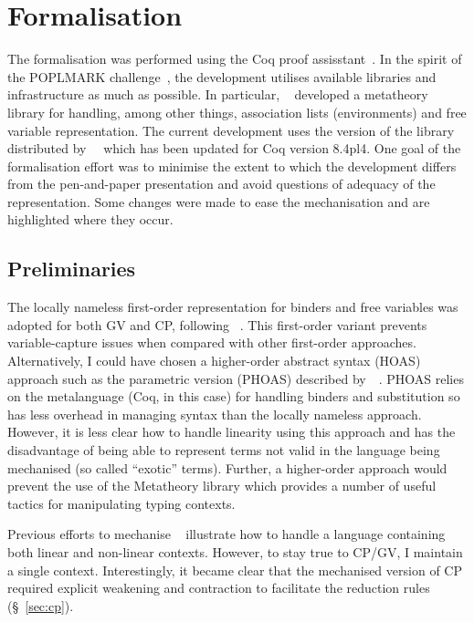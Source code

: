 \section{Formalisation}

The formalisation was performed using the Coq proof
assisstant~\cite{Coq:manual}. In the spirit of the POPLMARK
challenge~\cite{Aydemir:2005:MMM}, the development utilises available
libraries and infrastructure as much as possible. In particular,
\citeauthor{Aydemir:2008:EFM}~\cite{Aydemir:2008:EFM} developed a metatheory
library for handling, among other things, association lists (environments) and
free variable representation. The current development uses the version of the
library distributed by~\citeauthor{Park:2014:MMW}~\cite{Park:2014:MMW} which
has been updated for Coq version 8.4pl4. One goal of the formalisation effort
was to minimise the extent to which the development differs from the
pen-and-paper presentation and avoid questions of adequacy of the
representation. Some changes were made to ease the mechanisation and are
highlighted where they occur.

\subsection{Preliminaries}\label{sec:approach}

%


The locally nameless first-order representation for binders and free variables
was adopted for both GV and CP, following
\citeauthor{Aydemir:2008:EFM}~\cite{Aydemir:2008:EFM}. This first-order
variant prevents variable-capture issues when compared with other first-order
approaches. Alternatively, I could have chosen a higher-order abstract syntax
(HOAS) approach such as the parametric version (PHOAS) described
by~\citeauthor{Chlipala:2008:PHOAS}~\cite{Chlipala:2008:PHOAS}. PHOAS relies
on the metalanguage (Coq, in this case) for handling binders and substitution
so has less overhead in managing syntax than the locally nameless
approach. However, it is less clear how to handle linearity using this
approach and has the disadvantage of being able to represent terms not valid
in the language being mechanised (so called ``exotic'' terms). Further, a
higher-order approach would prevent the use of the Metatheory library which
provides a number of useful tactics for manipulating typing contexts.

Previous efforts to mechanise \fpop~\cite{Park:2014:MMW} illustrate how to
handle a language containing both linear and non-linear contexts. However, to
stay true to CP/GV, I maintain a single context. Interestingly, it became
clear that the mechanised version of CP required explicit weakening and
contraction to facilitate the reduction rules (\S~\ref{sec:cp}).

